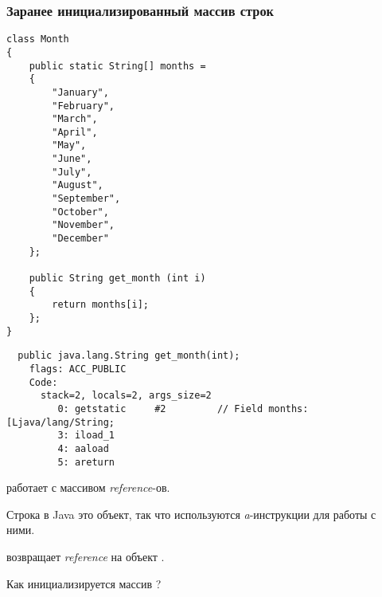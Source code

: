 \subsubsection{Заранее инициализированный массив строк}
\label{Java_2D_array_month}

\begin{lstlisting}[style=customjava]
class Month
{
	public static String[] months = 
	{
		"January", 
		"February", 
		"March", 
		"April",
		"May",
		"June",
		"July",
		"August",
		"September",
		"October",
		"November",
		"December"
	};

	public String get_month (int i)
	{
		return months[i];
	};
} 
\end{lstlisting}




\begin{lstlisting}
  public java.lang.String get_month(int);
    flags: ACC_PUBLIC
    Code:
      stack=2, locals=2, args_size=2
         0: getstatic     #2         // Field months:[Ljava/lang/String;
         3: iload_1       
         4: aaload        
         5: areturn       
\end{lstlisting}


 работает с массивом \emph{reference}-ов.

Строка в Java это объект, так что используются \emph{a}-инструкции для работы с ними.

 возвращает \emph{reference} на объект .


Как инициализируется массив ?


